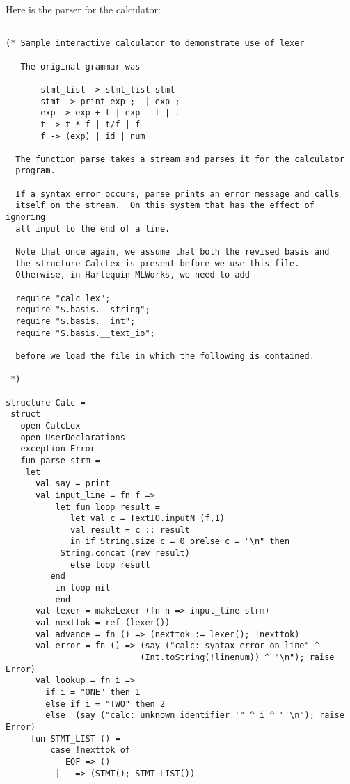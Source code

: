 \documentclass{article}
\begin{document}
Here is the parser for the calculator:
\begin{verbatim}

(* Sample interactive calculator to demonstrate use of lexer 
 
   The original grammar was

       stmt_list -> stmt_list stmt
       stmt -> print exp ;  | exp ;
       exp -> exp + t | exp - t | t
       t -> t * f | t/f | f
       f -> (exp) | id | num

  The function parse takes a stream and parses it for the calculator 
  program.

  If a syntax error occurs, parse prints an error message and calls
  itself on the stream.  On this system that has the effect of ignoring
  all input to the end of a line.  

  Note that once again, we assume that both the revised basis and
  the structure CalcLex is present before we use this file.
  Otherwise, in Harlequin MLWorks, we need to add

  require "calc_lex";
  require "$.basis.__string";
  require "$.basis.__int";
  require "$.basis.__text_io";

  before we load the file in which the following is contained.

 *)
       
structure Calc =
 struct
   open CalcLex
   open UserDeclarations
   exception Error
   fun parse strm =
    let
      val say = print
      val input_line = fn f =>
          let fun loop result =
             let val c = TextIO.inputN (f,1)
	         val result = c :: result
             in if String.size c = 0 orelse c = "\n" then
	  	   String.concat (rev result)
	         else loop result
	     end
          in loop nil
          end
      val lexer = makeLexer (fn n => input_line strm)
      val nexttok = ref (lexer())
      val advance = fn () => (nexttok := lexer(); !nexttok)
      val error = fn () => (say ("calc: syntax error on line" ^
                           (Int.toString(!linenum)) ^ "\n"); raise Error)
      val lookup = fn i =>
        if i = "ONE" then 1
        else if i = "TWO" then 2
        else  (say ("calc: unknown identifier '" ^ i ^ "'\n"); raise Error)
     fun STMT_LIST () =
         case !nexttok of
            EOF => ()
          | _ => (STMT(); STMT_LIST())
        

\end{verbatim}
\end{document}
